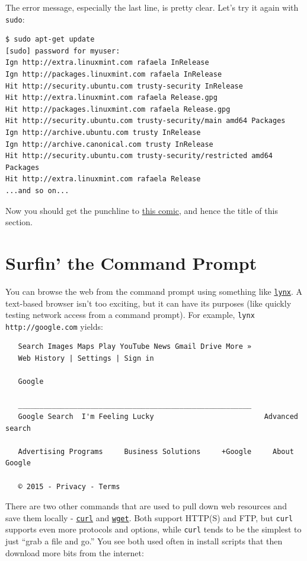\documentclass[10pt,]{book}
\numberwithin{figure}{chapter}
\begin{document}
The error message, especially the last line, is pretty clear. Let's try
it again with \texttt{sudo}:

\begin{verbatim}
$ sudo apt-get update
[sudo] password for myuser: 
Ign http://extra.linuxmint.com rafaela InRelease
Ign http://packages.linuxmint.com rafaela InRelease                            
Hit http://security.ubuntu.com trusty-security InRelease                       
Hit http://extra.linuxmint.com rafaela Release.gpg                             
Hit http://packages.linuxmint.com rafaela Release.gpg                          
Hit http://security.ubuntu.com trusty-security/main amd64 Packages             
Ign http://archive.ubuntu.com trusty InRelease                                 
Ign http://archive.canonical.com trusty InRelease                              
Hit http://security.ubuntu.com trusty-security/restricted amd64 Packages       
Hit http://extra.linuxmint.com rafaela Release                
...and so on...
\end{verbatim}

Now you should get the punchline to \href{https://xkcd.com/149/}{this
comic}, and hence the title of this section.

\section{Surfin' the Command Prompt}\label{surfin-the-command-prompt}

You can browse the web from the command prompt using something like
\href{http://linux.die.net/man/1/lynx}{\texttt{lynx}}. A text-based
browser isn't too exciting, but it can have its purposes (like quickly
testing network access from a command prompt). For example,
\texttt{lynx http://google.com} yields:

\begin{verbatim}
   Search Images Maps Play YouTube News Gmail Drive More »
   Web History | Settings | Sign in

   Google

   _______________________________________________________
   Google Search  I'm Feeling Lucky                          Advanced search

   Advertising Programs     Business Solutions     +Google     About Google

   © 2015 - Privacy - Terms
\end{verbatim}

There are two other commands that are used to pull down web resources
and save them locally -
\href{http://linux.die.net/man/1/curl}{\texttt{curl}} and
\href{http://linux.die.net/man/1/wget}{\texttt{wget}}. Both support
HTTP(S) and FTP, but \texttt{curl} supports even more protocols and
options, while \texttt{curl} tends to be the simplest to just ``grab a
file and go.'' You see both used often in install scripts that then
download more bits from the internet:
\end{document}
